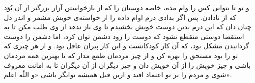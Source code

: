 و تو تا بتوانى كس را وام مده، خاصه دوستان را كه از باز‌خواستن آزار بزرگتر از آن بُوَد كه از نادادن. پس اگر بدادى درم اوام داده را از خواسته‌ی خويش مشمر و اندر دل چنان دان كه اين درم بدين دوست خويش بخشيدم تا وى باز ندهد از وى طلب مكن تا به استقضا دوستى منقطع نشود كه دوست را زود دشمن توان كرد، اما دشمن را دوست گردانيدن مشكل بود، كه آن كار كودكانست و اين كار پيران عاقل بود. و از هر چيزى كه تو را بود مستحق را بهره كن و از چيز مردمان طمع مدار كه تا بهترين همه مردمان باشى و چيز خويش را از آن خويش دان و چيز ديگران از آن ديگران تا به امانت معروف‌ شوى و مردم را بر تو اعتماد افتد و ازين قبل هميشه توانگر باشى «و اللّه اعلم».




















\newpage


